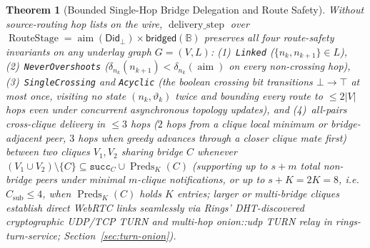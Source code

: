 \documentclass[journal]{IEEEtran}
\newtheorem{theorem}{Theorem}
\DeclareRobustCommand{\code}[1]{{\ttfamily\renewcommand{\_}{\textunderscore\allowbreak}#1}}
\begin{document}
\begin{theorem}[Bounded Single-Hop Bridge Delegation and Route Safety]\label{theo:bridge-safety}
Without source-routing hop lists on the wire, $\operatorname{delivery\_step}$
over $\operatorname{RouteStage}=\operatorname{aim}(\mathsf{Did}_{\bot})\times\mathsf{bridged}(\mathbb{B})$
preserves all four route-safety invariants on any underlay graph $G=(V,L)$:
(1)~\texttt{Linked} ($\{n_k,n_{k+1}\}\in L$),
(2)~\texttt{NeverOvershoots} ($\delta_{n_k}(n_{k+1})<\delta_{n_k}(\operatorname{aim})$ on every non-crossing hop),
(3)~\texttt{SingleCrossing} and \texttt{Acyclic} (the boolean crossing bit transitions $\bot\to\top$ at most once, visiting no state $(n_k,\vartheta_k)$ twice and bounding every route to $\le 2|V|$ hops even under concurrent asynchronous topology updates), and
(4)~all-pairs cross-clique delivery in $\le 3$ hops ($2$ hops from a clique local minimum or bridge-adjacent peer, $3$ hops when greedy advances through a closer clique mate first) between two cliques $V_1,V_2$ sharing bridge $C$ whenever $(V_1\cup V_2)\setminus\{C\}\subseteq\texttt{succ}_C\cup\operatorname{Preds}_K(C)$ (supporting up to $s+m$ total non-bridge peers under minimal $m$-clique notifications, or up to $s+K=2K=8$, i.e.\ $C_{\mathrm{sub}}\le 4$, when $\operatorname{Preds}_K(C)$ holds $K$ entries; larger or multi-bridge cliques establish direct WebRTC links seamlessly via Rings' DHT-discovered cryptographic UDP/TCP TURN and multi-hop \code{onion::udp} TURN relay in \code{rings-turn-service}; Section~\ref{sec:turn-onion}).
\end{theorem}
\end{document}
